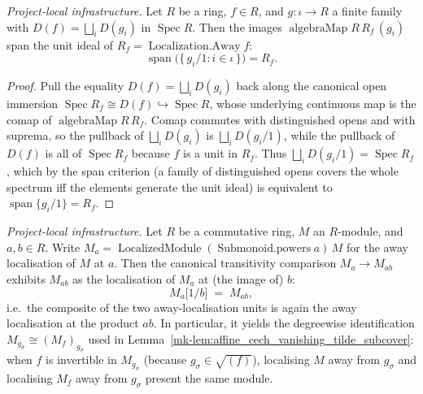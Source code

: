\begin{lemma}\label{mk-lem:affine_cover_span_localizationAway}
  \leanok

  \textit{Project-local infrastructure.}
  Let \(R\) be a ring, \(f \in R\), and \(g : \iota \to R\) a finite family with \(D(f) =
  \bigsqcup_i D(g_i)\) in \(\operatorname{Spec} R\). Then the images
  \(\operatorname{algebraMap} R\, R_f\, (g_i)\) span the unit ideal of \(R_f =
  \operatorname{Localization.Away} f\):
  \[
    \operatorname{span}\bigl(\{\, g_i/1 : i \in \iota \,\}\bigr) = R_f.
  \]
\end{lemma}
\begin{proof}
  \leanok


Pull the equality \(D(f) = \bigsqcup_i D(g_i)\) back along the canonical open immersion
  \(\operatorname{Spec} R_f \cong D(f) \hookrightarrow \operatorname{Spec} R\), whose underlying
  continuous map is the comap of \(\operatorname{algebraMap} R\, R_f\). Comap commutes with
  distinguished opens and with suprema, so the pullback of \(\bigsqcup_i D(g_i)\) is
  \(\bigsqcup_i D(g_i/1)\), while the pullback of \(D(f)\) is all of \(\operatorname{Spec} R_f\)
  because \(f\) is a unit in \(R_f\). Thus \(\bigsqcup_i D(g_i/1) = \operatorname{Spec} R_f\), which
  by the span criterion (a family of distinguished opens covers the whole spectrum iff the elements
  generate the unit ideal) is equivalent to \(\operatorname{span}\{g_i/1\} = R_f\).
\end{proof}

\begin{lemma}\label{mk-lem:away_comparison_isLocalizedModule}
  \leanok

  \textit{Project-local infrastructure.}
  Let \(R\) be a commutative ring, \(M\) an \(R\)-module, and \(a, b \in R\). Write
  \(M_a = \operatorname{LocalizedModule}(\operatorname{Submonoid.powers} a)\, M\) for the away
  localisation of \(M\) at \(a\). Then the canonical transitivity comparison \(M_a \to M_{ab}\)
  exhibits \(M_{ab}\) as the localisation of \(M_a\) at (the image of) \(b\):
  \[
    M_a\bigl[1/b\bigr] \;=\; M_{ab},
  \]
  i.e.\ the composite of the two away-localisation units is again the away localisation at the product
  \(ab\). In particular, it yields the degreewise identification
  \(M_{g_\sigma} \cong (M_f)_{g_\sigma}\) used in
  Lemma~\ref{mk-lem:affine_cech_vanishing_tilde_subcover}: when \(f\) is invertible in \(M_{g_\sigma}\)
  (because \(g_\sigma \in \sqrt{(f)}\)), localising \(M\) away from \(g_\sigma\) and localising
  \(M_f\) away from \(g_\sigma\) present the same module.
\end{lemma}

